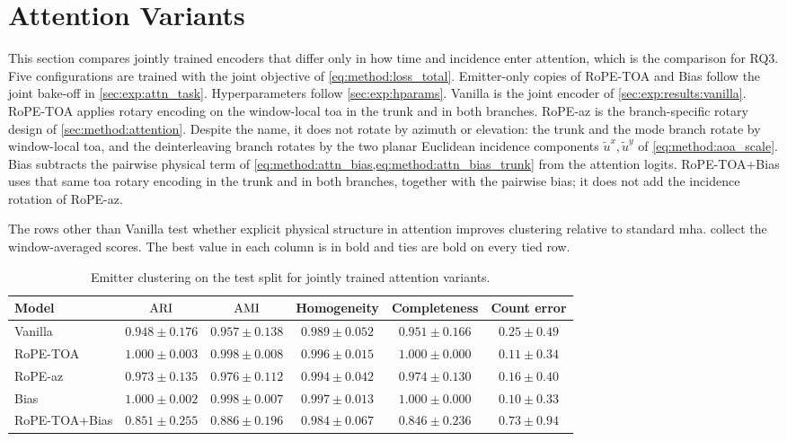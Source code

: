 \clearpage
\section{Attention Variants}\label{sec:exp:attention}\label{sec:exp:results:attention}

This section compares jointly trained encoders that differ only in how time and incidence enter attention, which is the comparison for RQ3.
Five configurations are trained with the joint objective of \cref{eq:method:loss_total}.
Emitter-only copies of RoPE-TOA and Bias follow the joint bake-off in \cref{sec:exp:attn_task}.
Hyperparameters follow \cref{sec:exp:hparams}.
Vanilla is the joint encoder of \cref{sec:exp:results:vanilla}.
RoPE-TOA applies rotary encoding on the window-local \gls{toa} in the trunk and in both branches.
RoPE-az is the branch-specific rotary design of \cref{sec:method:attention}.
Despite the name, it does not rotate by azimuth or elevation: the trunk and the mode branch rotate by window-local \gls{toa}, and the deinterleaving branch rotates by the two planar Euclidean incidence components $\tilde{u}^{x},\tilde{u}^{y}$ of \cref{eq:method:aoa_scale}.
Bias subtracts the pairwise physical term of \cref{eq:method:attn_bias,eq:method:attn_bias_trunk} from the attention logits.
RoPE-TOA+Bias uses that same \gls{toa} rotary encoding in the trunk and in both branches, together with the pairwise bias; it does not add the incidence rotation of RoPE-az.

The rows other than Vanilla test whether explicit physical structure in attention improves clustering relative to standard \gls{mha}.
 collect the window-averaged scores.
The best value in each column is in bold and ties are bold on every tied row.

\begin{table}[H]
  \centering
  \small
  \caption{Emitter clustering on the test split for jointly trained attention variants.}
  \label{tab:exp:attn_em}
  \begin{tabular}{@{}lccccc@{}}
    \toprule
    Model & $\mathrm{ARI}$ & $\mathrm{AMI}$ & Homogeneity & Completeness & Count error \\
    \midrule
    Vanilla   & $0.948\pm0.176$ & $0.957\pm0.138$ & $0.989\pm0.052$ & $0.951\pm0.166$ & $0.25\pm0.49$ \\
    RoPE-TOA  & $\mathbf{1.000\pm0.003}$ & $\mathbf{0.998\pm0.008}$ & $0.996\pm0.015$ & $\mathbf{1.000\pm0.000}$ & $0.11\pm0.34$ \\
    RoPE-az   & $0.973\pm0.135$ & $0.976\pm0.112$ & $0.994\pm0.042$ & $0.974\pm0.130$ & $0.16\pm0.40$ \\
    Bias      & $\mathbf{1.000\pm0.002}$ & $\mathbf{0.998\pm0.007}$ & $\mathbf{0.997\pm0.013}$ & $\mathbf{1.000\pm0.000}$ & $\mathbf{0.10\pm0.33}$ \\
    RoPE-TOA+Bias & $0.851\pm0.255$ & $0.886\pm0.196$ & $0.984\pm0.067$ & $0.846\pm0.236$ & $0.73\pm0.94$ \\
    \bottomrule
  \end{tabular}
\end{table}

